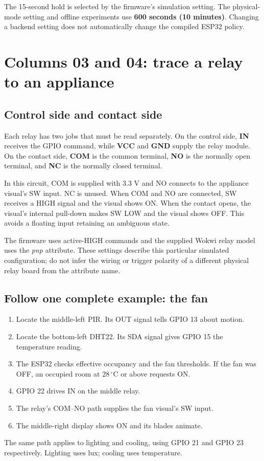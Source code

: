 \documentclass[11pt,a4paper]{article}
\newcommand{\temp}[1]{\ensuremath{#1\,^{\circ}\mathrm{C}}}
\begin{document}
The 15-second hold is selected by the firmware's simulation setting.
The physical-mode setting and offline experiments use
\textbf{600 seconds (10 minutes)}. Changing a backend setting does not
automatically change the compiled ESP32 policy.

\section{Columns 03 and 04: trace a relay to an appliance}
\subsection{Control side and contact side}
Each relay has two jobs that must be read separately. On the control
side, \textbf{IN} receives the GPIO command, while \textbf{VCC} and
\textbf{GND} supply the relay module. On the contact side, \textbf{COM}
is the common terminal, \textbf{NO} is the normally open terminal, and
\textbf{NC} is the normally closed terminal.

In this circuit, COM is supplied with 3.3 V and NO connects to the
appliance visual's SW input. NC is unused. When COM and NO are connected,
SW receives a HIGH signal and the visual shows ON. When the contact
opens, the visual's internal pull-down makes SW LOW and the visual
shows OFF. This avoids a floating input retaining an ambiguous state.

The firmware uses active-HIGH commands and the supplied Wokwi relay
model uses the \emph{pnp} attribute. These settings describe this
particular simulated configuration; do not infer the wiring or trigger
polarity of a different physical relay board from the attribute name.

\subsection{Follow one complete example: the fan}
\begin{enumerate}
  \item Locate the middle-left PIR. Its OUT signal tells GPIO 13 about motion.
  \item Locate the bottom-left DHT22. Its SDA signal gives GPIO 15 the
  temperature reading.
  \item The ESP32 checks effective occupancy and the fan thresholds.
  If the fan was OFF, an occupied room at \temp{28} or above requests ON.
  \item GPIO 22 drives IN on the middle relay.
  \item The relay's COM--NO path supplies the fan visual's SW input.
  \item The middle-right display shows ON and its blades animate.
\end{enumerate}
The same path applies to lighting and cooling, using GPIO 21 and GPIO
23 respectively. Lighting uses lux; cooling uses temperature.
\end{document}
